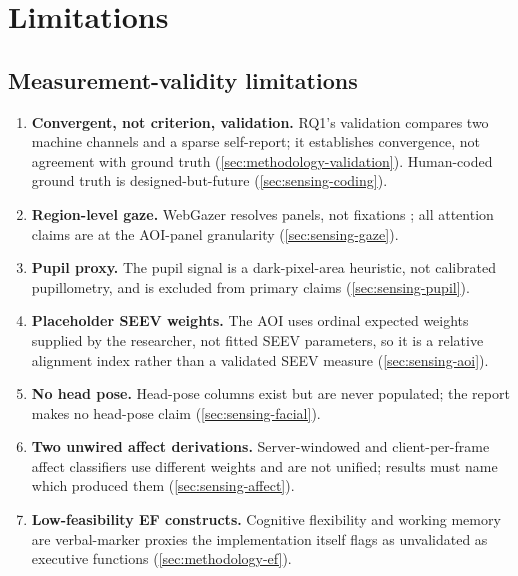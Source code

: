 \chapter{Limitations}
\label{ch:limitations}


\section{Measurement-validity limitations}
\label{sec:limitations-measurement}

\begin{enumerate}
  \item \textbf{Convergent, not criterion, validation.} RQ1's validation
  compares two machine channels and a sparse self-report; it establishes
  convergence, not agreement with ground truth
  (\cref{sec:methodology-validation}). Human-coded ground truth is
  designed-but-future (\cref{sec:sensing-coding}).
  \item \textbf{Region-level gaze.} WebGazer resolves panels, not
  fixations \citep{papoutsaki2016webgazer}; all attention claims are at
  the AOI-panel granularity (\cref{sec:sensing-gaze}).
  \item \textbf{Pupil proxy.} The pupil signal is a dark-pixel-area
  heuristic, not calibrated pupillometry, and is excluded from primary
  claims (\cref{sec:sensing-pupil}).
  \item \textbf{Placeholder SEEV weights.} The AOI \allocscore{} uses
  ordinal expected weights supplied by the researcher, not fitted SEEV
  parameters, so it is a relative alignment index rather than a validated
  SEEV measure (\cref{sec:sensing-aoi}).
  \item \textbf{No head pose.} Head-pose columns exist but are never
  populated; the report makes no head-pose claim
  (\cref{sec:sensing-facial}).
  \item \textbf{Two unwired affect derivations.} Server-windowed and
  client-per-frame affect classifiers use different weights and are not
  unified; results must name which produced them
  (\cref{sec:sensing-affect}).
  \item \textbf{Low-feasibility EF constructs.} Cognitive flexibility and
  working memory are verbal-marker proxies the implementation itself flags
  as unvalidated as executive functions
  (\cref{sec:methodology-ef}).
\end{enumerate}

